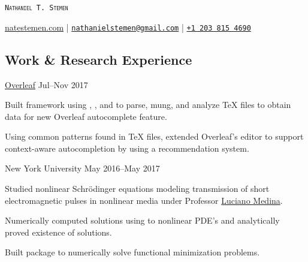\documentclass{cultvoucher}
\begin{document}
\begin{flushleft}
    {\Huge{\textsc{\texttt{Nathaniel T. Stemen}}}}
    
    {\url{natestemen.com} |
    \href{mailto:nathanielstemen@gmail.com}{\nolinkurl{nathanielstemen@gmail.com}}} |
    \href{tel:12038154690}{\texttt{+1\,203\,815\,4690}}
\end{flushleft}

\vspace{-10pt}

\begin{paracol}{2}

\section{Work \& Research Experience}

         {\href{https://www.overleaf.com/}{Overleaf}}
         {Jul--Nov 2017}
\begin{tightitemize}
    \item Built framework using , , and
           to parse, mung, and analyze \TeX{} files to obtain
          data for new Overleaf autocomplete feature.
    \item Using common patterns found in \TeX{} files, extended Overleaf's
          editor to support context-aware autocompletion by using a
          recommendation system.
\end{tightitemize}

         {New York University}
         {May 2016--May 2017}
\begin{tightitemize}
	\item Studied nonlinear Schr\"{o}dinger equations modeling transmission of
          short electromagnetic pulses in nonlinear media under Professor
          \href{https://www.sites.google.com/a/nyu.edu/luciano-medina/}{Luciano Medina}.
	\item Numerically computed solutions using  to nonlinear
          PDE's and analytically proved existence of solutions.
	\item Built package to numerically solve functional minimization problems.
\end{tightitemize}


\end{paracol}
\end{document}
